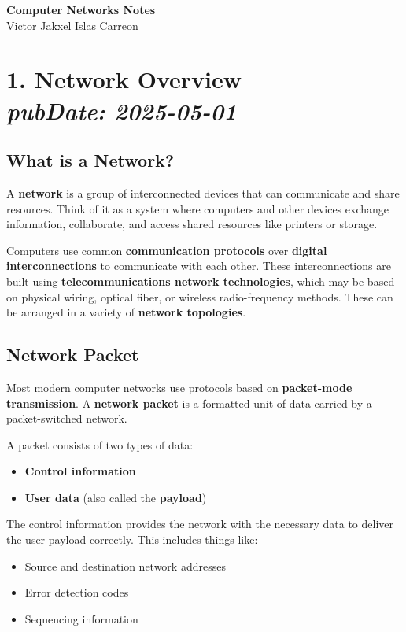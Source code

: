 \documentclass[11pt]{article}
\begin{document}
\begin{center}
    {\Huge \textbf{Computer Networks Notes}}\\[0.5em]
    {\large Victor Jakxel Islas Carreon}
\end{center}

\newpage
\tableofcontents
\newpage

\section*{1. Network Overview \\ \normalsize{\textit{pubDate: 2025-05-01}}}

\subsection*{What is a Network?}
A \textbf{network} is a group of interconnected devices that can communicate and share resources. Think of it as a system where computers and other devices exchange information, collaborate, and access shared resources like printers or storage.

Computers use common \textbf{communication protocols} over \textbf{digital interconnections} to communicate with each other. These interconnections are built using \textbf{telecommunications network technologies}, which may be based on physical wiring, optical fiber, or wireless radio-frequency methods. These can be arranged in a variety of \textbf{network topologies}.

\subsection*{Network Packet}
Most modern computer networks use protocols based on \textbf{packet-mode transmission}. A \textbf{network packet} is a formatted unit of data carried by a packet-switched network.

A packet consists of two types of data:
\begin{itemize}
    \item \textbf{Control information}
    \item \textbf{User data} (also called the \textbf{payload})
\end{itemize}

The control information provides the network with the necessary data to deliver the user payload correctly. This includes things like:
\begin{itemize}
    \item Source and destination network addresses
    \item Error detection codes
    \item Sequencing information
\end{itemize}
\end{document}
